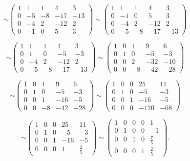 \[
\sim
\left(
\begin{array}{cccc|c}
1 & 1 & 1 & 4 & 3\\
0 & -5 & -8 & -17 & -13\\
0 & -4 & 2 & -12 & 2\\
0 & -1 & 0 & 5 & 3
\end{array}
\right)
\sim
\left(
\begin{array}{cccc|c}
1 & 1 & 1 & 4 & 3\\
0 & -1 & 0 & 5 & 3\\
0 & -4 & 2 & -12 & 2\\
0 & -5 & -8 & -17 & -13
\end{array}
\right)
\]

\[
\sim
\left(
\begin{array}{cccc|c}
1 & 1 & 1 & 4 & 3\\
0 & 1 & 0 & -5 & -3\\
0 & -4 & 2 & -12 & 2\\
0 & -5 & -8 & -17 & -13
\end{array}
\right)
\sim
\left(
\begin{array}{cccc|c}
1 & 0 & 1 & 9 & 6\\
0 & 1 & 0 & -5 & -3\\
0 & 0 & 2 & -32 & -10\\
0 & 0 & -8 & -42 & -28
\end{array}
\right)
\]

\[
\sim
\left(
\begin{array}{cccc|c}
1 & 0 & 1 & 9 & 6\\
0 & 1 & 0 & -5 & -3\\
0 & 0 & 1 & -16 & -5\\
0 & 0 & -8 & -42 & -28
\end{array}
\right)
\sim
\left(
\begin{array}{cccc|c}
1 & 0 & 0 & 25 & 11\\
0 & 1 & 0 & -5 & -3\\
0 & 0 & 1 & -16 & -5\\
0 & 0 & 0 & -170 & -68
\end{array}
\right)
\]

\[
\sim
\left(
\begin{array}{cccc|c}
1 & 0 & 0 & 25 & 11\\
0 & 1 & 0 & -5 & -3\\
0 & 0 & 1 & -16 & -5\\
0 & 0 & 0 & 1 & \frac25
\end{array}
\right)
\sim
\left(
\begin{array}{cccc|c}
1 & 0 & 0 & 0 & 1\\
0 & 1 & 0 & 0 & -1\\
0 & 0 & 1 & 0 & \frac75\\
0 & 0 & 0 & 1 & \frac25
\end{array}
\right).
\]

